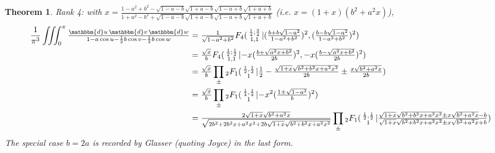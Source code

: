 \documentclass[12pt]{article}
\newcommand{\dd}[0] {\mathbbm{d}}
\numberwithin{equation}{section}
\newtheorem{theorem}{Theorem}[section]
\newcommand{\Head}[3] {{}_{#1}{#2}_{#3}}
\newcommand{\ArgS}[3] {( \begin{smallmatrix} #1 \\ #2 \end{smallmatrix} | {#3})}
\newcommand{\ArgKS}[1] {\ArgS{\frac12,\frac12}{1}{#1}}
\newcommand{\appellFfourS}[6]    {F_4 \ArgS{{#1};{#2}}{{#3},{#4}}{{#5},{#6}}}
\begin{document}
\begin{theorem} Rank 4: with $x = \tfrac{1-a^2+b^2 - \sqrt{1-a-b} \sqrt{1+a-b} \sqrt{1-a+b} \sqrt{1+a+b}}{1+a^2-b^2 + \sqrt{1-a-b} \sqrt{1+a-b} \sqrt{1-a+b} \sqrt{1+a+b}}$ (i.e. $x = (1+x)(b^2 + a^2 x)$),
\begin{align*}
\frac{1}{\pi^3} \iiint_0^{\pi} \tfrac{\dd u \, \dd v \, \dd w} {1 - a \cos u - \frac12 b \cos v - \frac12 b \cos w}
& = \tfrac{1}{\sqrt{1-a^2+b^2}} \appellFfourS{\frac14}{\frac34}{1}{1}{(\tfrac{b+b\sqrt{1-a^2}}{1-a^2+b^2})^2}{(\tfrac{b-b\sqrt{1-a^2}}{1-a^2+b^2})^2}\\
& = \tfrac{\sqrt{x}}{b} \appellFfourS{\frac12}{\frac12}{1}{1}{-x (\tfrac{b+\sqrt{a^2 x+b^2}}{2 b})^2}{-x (\tfrac{b-\sqrt{a^2 x+b^2}}{2b})^2}\\
&= \tfrac{\sqrt{x}}{b} \prod_{\pm} \Head{2}{F}{1} \ArgKS{\tfrac{1}{2}-\tfrac{\sqrt{1+x}\sqrt{b^2+b^2 x + a^2 x^2}}{2b} \pm \tfrac{x\sqrt{b^2+a^2 x}}{2b}}\\
&= \tfrac{\sqrt{x}}{b} \prod_{\pm} \Head{2}{F}{1} \ArgS{\frac14,\frac14}{1}{- x^2 (\tfrac{1 \pm \sqrt{1-a^2}}{b})^2}\\
&=\tfrac{2\sqrt{1+x}\sqrt{b^2+a^2 x}}{\sqrt{2b^2 + 2b^2 x + a^2 x^2 + 2b \sqrt{1+x}\sqrt{b^2+b^2 x + a^2 x^2}}} \prod_{\pm} \Head{2}{F}{1} \ArgKS{\tfrac{\sqrt{1+x}\sqrt{b^2+b^2 x+a^2 x^2} \pm x \sqrt{b^2+ a^2 x}-b}{\sqrt{1+x}\sqrt{b^2+b^2 x+a^2 x^2} \pm x \sqrt{b^2+ a^2 x}+b}}
\end{align*}
The special case $b = 2a$ is recorded by Glasser (quoting Joyce) in the last form.
\end{theorem}
\end{document}
